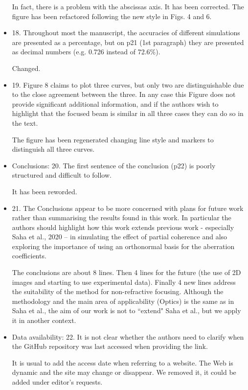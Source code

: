 \documentclass[11pt]{letter} %
\newcommand{\inred}[1]{{\color{red}#1}}
\begin{document}
\begin{letter}{}
\begin{itemize}
    \inred{In fact, there is a problem with the abscissas axis. It has been corrected. The figure has been refactored following the new style in Figs. 4 and 6. }
    
    \item 18. Throughout most the manuscript, the accuracies of different simulations are presented as a percentage, but on p21 (1st paragraph) they are presented as decimal numbers (e.g. 0.726 instead of 72.6\%).
    
    \inred{Changed.}
    
    \item 19. Figure 8 claims to plot three curves, but only two are distinguishable due to the close agreement between the three. In any case this Figure does not provide significant additional information, and if the authors wish to highlight that the focused beam is similar in all three cases they can do so in the text.
    
    \inred{The figure has been regenerated changing line style and markers to distinguish all three curves.}
    
    \item Conclusions: 20. The first sentence of the conclusion (p22) is poorly structured and difficult to follow.
    
    \inred{It has been reworded.}
    
    \item 21. The Conclusions appear to be more concerned with plans for future work rather than summarising the results found in this work. In particular the authors should highlight how this work extends previous work - especially Saha et al., 2020 – in simulating the effect of partial coherence and also exploring the importance of using an orthonormal basis for the aberration coefficients.
    
    \inred{The conclusions are about 8 lines. Then 4 lines for the future (the use of 2D images and starting to use experimental data). Finally 4 new lines address the suitability of the method for non-refractive focusing. Although the methodology and the main area of applicability (Optics) is the same as in Saha et al., the aim of our work is not to ``extend" Saha et al., but we apply it in another context. }
    
    \item Data availability: 22. It is not clear whether the authors need to clarify when the GitHub repository was last accessed when providing the link. 
    
    \inred{It is usual to add the access date when referring to a website. The Web is dynamic and the site may change or disappear. We removed it, it could be added under editor's requests. }
    

\end{itemize}
\end{letter}
\end{document}
